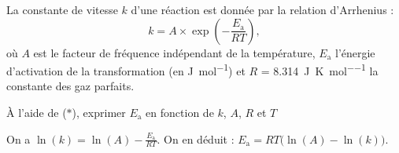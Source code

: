 \bigskip

La constante de vitesse $k$ d'une réaction est donnée par la relation d'Arrhenius :
\[
k = A \times \exp\left(-\dfrac{E_\text{a}}{RT}\right), \tag{$\ast$}
\]
où $A$ est le facteur de fréquence indépendant de la température, $E_\text{a}$ l'énergie d'activation de la transformation (en \si{\joule\per\mol}) et $R$ = \SI{8,314}{\joule\per\kelvin\per\mol} la constante des gaz parfaits.




\hauteurLargeurCadreReponse		{8mm}{5cm}
\initialisationEntrainement


\debutEntrainement


\begin{enonce}
À l'aide de ($\ast$), exprimer $E_\text{a}$ en fonction de $k$, $A$, $R$ et $T$
\end{enonce}


\begin{corrige}
On a $\ln(k)=\ln(A)-\frac{E_\text{a}}{RT}$. On en déduit : $E_\text{a}=RT\big(\ln(A)-\ln(k)\big)$.
 \end{corrige}



\pauseEntrainement


